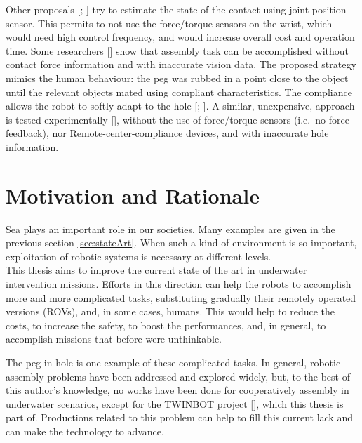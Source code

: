 Other proposals [\cite{IntroPeg10}; \cite{IntroPeg11}] try to estimate the state of the contact using joint position sensor. This permits to not use the force/torque sensors on the wrist, which would need high control frequency, and would increase overall cost and operation time. 
Some researchers [\cite{IntroPeg12}] show that assembly task can be accomplished without contact force information and with inaccurate vision data. The proposed strategy  mimics the human behaviour: the peg was rubbed in a point close to the object until the relevant objects mated using compliant characteristics. The compliance allows the robot to softly adapt to the hole [\cite{IntroPeg13}; \cite{IntroPeg14}].
A similar, unexpensive, approach is tested experimentally [\cite{IntroPeg15}], without the use of force/torque sensors (i.e.\ no force feedback), nor Remote-center-compliance devices, and with inaccurate hole information.




\section{Motivation and Rationale}
Sea plays an important role in our societies. Many examples are given in the previous section \ref{sec:stateArt}. When such a kind of environment is so important, exploitation of robotic systems is necessary at different levels.\\
This thesis aims to improve the current state of the art in underwater intervention missions. Efforts in this direction can help the robots to accomplish more and more complicated tasks, substituting gradually their remotely operated versions (ROVs), and, in some cases, humans. This would help to reduce the costs, to increase the safety, to boost the performances, and, in general, to accomplish missions that before were unthinkable.

The peg-in-hole is one example of these complicated tasks. In general, robotic assembly problems have been addressed and explored widely, but, to the best of this author's knowledge, no works have been done for cooperatively assembly in underwater scenarios, except for the TWINBOT project [\cite{TWINBOT2019}], which this thesis is part of. Productions related to this problem can help to fill this current lack and can make the technology to advance. 

